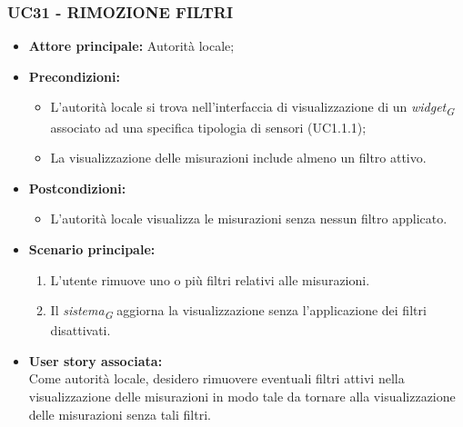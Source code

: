 \subsubsection{UC31 - RIMOZIONE FILTRI}
\begin{itemize}
    \item \textbf{Attore principale:} Autorità locale;
    \item \textbf{Precondizioni:}
        \begin{itemize}
        \item L'autorità locale si trova nell'interfaccia di visualizzazione di un \textit{widget}\textsubscript{\textit{G}} associato ad una specifica tipologia di sensori (UC1.1.1);
        \item La visualizzazione delle misurazioni include almeno un filtro attivo.
        \end{itemize}
    \item \textbf{Postcondizioni:}
        \begin{itemize}
            \item L'autorità locale visualizza le misurazioni senza nessun filtro applicato.
        \end{itemize}
    \item \textbf{Scenario principale:}
        \begin{enumerate}
            \item L'utente rimuove uno o più filtri relativi alle misurazioni.
            \item Il \textit{sistema}\textsubscript{\textit{G}} aggiorna la visualizzazione senza l'applicazione dei filtri disattivati.
        \end{enumerate}
    \item \textbf{User story associata:} \\
        Come autorità locale, desidero rimuovere eventuali filtri attivi nella visualizzazione delle misurazioni in modo tale da tornare alla visualizzazione delle misurazioni senza tali filtri.
\end{itemize}
